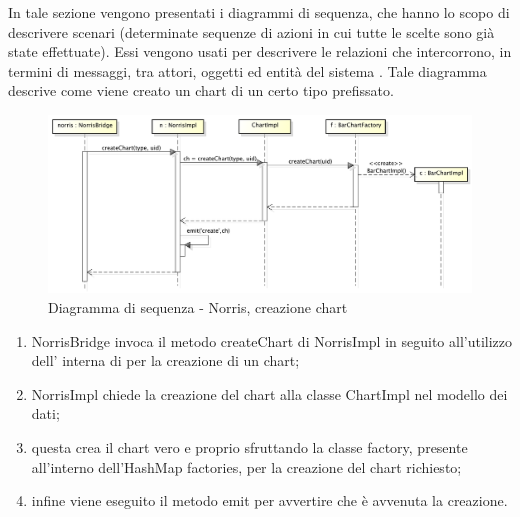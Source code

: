     	In tale sezione vengono presentati i diagrammi di sequenza, che hanno lo scopo di descrivere scenari (determinate sequenze di azioni in cui tutte le scelte sono già state effettuate). Essi vengono usati per descrivere le relazioni che intercorrono, in termini di messaggi, tra attori, oggetti ed entità del sistema .
        	Tale diagramma descrive come viene creato un chart di un certo tipo prefissato.
            \begin{figure}[H]
                \centering
                \includegraphics[scale=0.3]{DefinizioneDiProdotto/Pics/NorrisCreazioneChart}
                \caption{Diagramma di sequenza - Norris, creazione chart}
            \end{figure}
            \begin{enumerate}
                \item NorrisBridge invoca il metodo createChart di NorrisImpl in seguito all'utilizzo dell' interna di  per la creazione di un chart;
                \item NorrisImpl chiede la creazione del chart alla classe ChartImpl nel modello dei dati;
                \item questa crea il chart vero e proprio sfruttando la classe factory, presente all'interno dell'HashMap factories, per la creazione del chart richiesto;
                \item infine viene eseguito il metodo emit per avvertire che è avvenuta la creazione.
            \end{enumerate}


